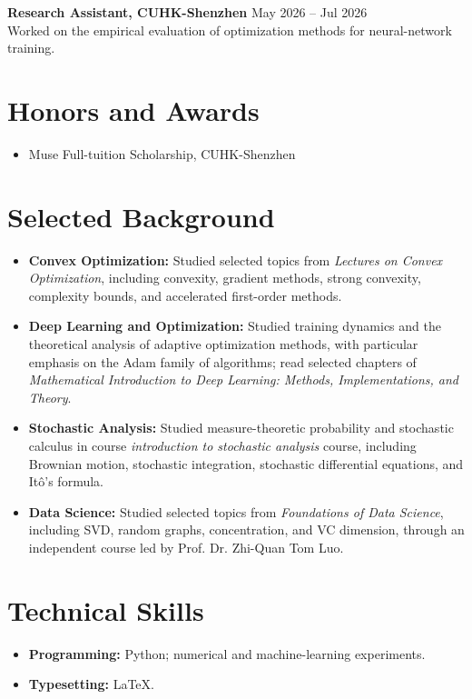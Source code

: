 \documentclass[11pt]{article}
\begin{document}
\textbf{Research Assistant, CUHK-Shenzhen} \hfill May 2026 -- Jul 2026\\
Worked on the empirical evaluation of optimization methods for neural-network training.

\section*{Honors and Awards}

\begin{itemize}
    \item Muse Full-tuition Scholarship, CUHK-Shenzhen
\end{itemize}

\section*{Selected Background}

\begin{itemize}
    \item \textbf{Convex Optimization:} Studied selected topics from \textit{Lectures on Convex Optimization}, including convexity, gradient methods, strong convexity, complexity bounds, and accelerated first-order methods.
    \item \textbf{Deep Learning and Optimization:} Studied training dynamics and the theoretical analysis of adaptive optimization methods, with particular emphasis on the Adam family of algorithms; read selected chapters of \textit{Mathematical Introduction to Deep Learning: Methods, Implementations, and Theory}.
    \item \textbf{Stochastic Analysis:} Studied measure-theoretic probability and stochastic calculus in course {\itshape introduction to stochastic analysis} course, including Brownian motion, stochastic integration, stochastic differential equations, and It\^o's formula.
    \item \textbf{Data Science:} Studied selected topics from \textit{Foundations of Data Science}, including SVD, random graphs, concentration, 
    and VC dimension, through an independent course led by Prof. Dr. Zhi-Quan Tom Luo.
\end{itemize}

\section*{Technical Skills}

\begin{itemize}
    \item \textbf{Programming:} Python; numerical and machine-learning experiments.
    \item \textbf{Typesetting:} \LaTeX.
\end{itemize}
\end{document}
